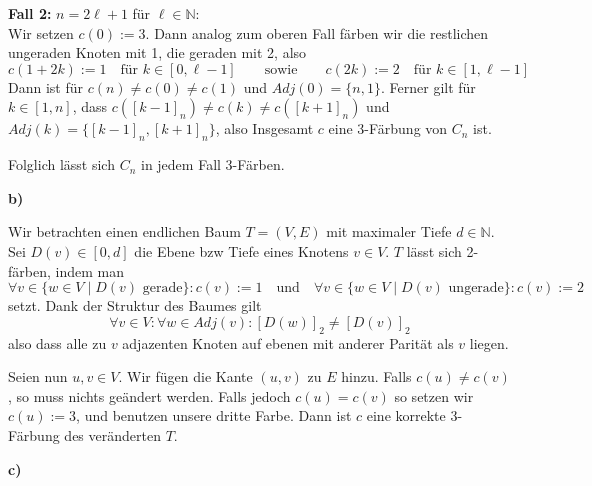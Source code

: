 \documentclass[a4paper,graphics,11pt]{article}
\begin{document}
\textbf{Fall 2:} $n = 2\ell+1$ für $\ell \in \mathbb{N}$:\\
Wir setzen $c(0) := 3$. Dann analog zum oberen Fall färben wir die restlichen ungeraden Knoten mit 1, die geraden mit 2, also
$$
    c(1+2k) := 1\quad\text{für $k \in [0,\ell-1]$}
    \qquad\text{sowie}\qquad
    c(2k) := 2\quad\text{für $k \in [1,\ell-1]$}
$$
Dann ist für $c(n) \neq c(0) \neq c(1)$ und $Adj(0) = \{n,1\}$. Ferner gilt für $k \in [1,n]$, dass $c([k-1]_n) \neq c(k) \neq c([k+1]_n)$ und $Adj(k) = \{[k-1]_n, [k+1]_n\}$, also Insgesamt $c$ eine 3-Färbung von $C_n$ ist.

Folglich lässt sich $C_n$ in jedem Fall 3-Färben.


\textbf{b)}

Wir betrachten einen endlichen Baum $T = (V,E)$ mit maximaler Tiefe $d \in \mathbb{N}$.
Sei $D(v) \in [0,d]$ die Ebene bzw Tiefe eines Knotens $v \in V$. $T$ lässt sich 2-färben, indem man
$$
    \forall v \in \{w \in V \mid D(v) \text{ gerade}\}: c(v) := 1
    \quad\text{und}\quad
    \forall v \in \{w \in V \mid D(v) \text{ ungerade}\}: c(v) := 2
$$
setzt. Dank der Struktur des Baumes gilt
$$
    \forall v \in V: \forall w \in Adj(v): [D(w)]_2 \neq [D(v)]_2
$$
also dass alle zu $v$ adjazenten Knoten auf ebenen mit anderer Parität als $v$ liegen.

Seien nun $u,v \in V$. Wir fügen die Kante $(u,v)$ zu $E$ hinzu. Falls $c(u) \neq c(v)$, so muss nichts geändert werden.
Falls jedoch $c(u) = c(v)$ so setzen wir $c(u) := 3$, und benutzen unsere dritte Farbe.
Dann ist $c$ eine korrekte 3-Färbung des veränderten $T$.

\newpage

\textbf{c)}
\end{document}
